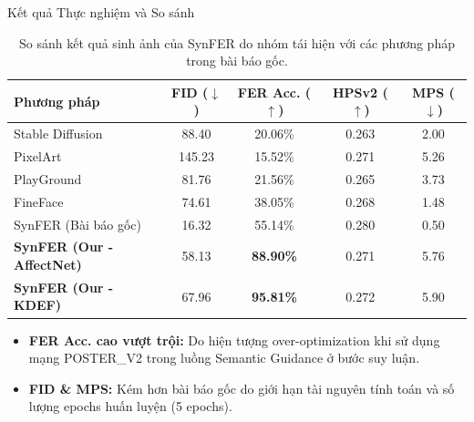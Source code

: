 \begin{frame}{Kết quả Thực nghiệm và So sánh}
    \begin{table}[htbp]
        \caption{So sánh kết quả sinh ảnh của SynFER do nhóm tái hiện với các phương pháp trong bài báo gốc.}
        \label{tab:slide_exp_results}
        \centering
        \small
        \begin{tabular}{lcccc}
            \toprule
            \textbf{Phương pháp}              & \textbf{FID} ($\downarrow$) & \textbf{FER Acc.} ($\uparrow$) & \textbf{HPSv2} ($\uparrow$) & \textbf{MPS} ($\downarrow$) \\
            \midrule
            Stable Diffusion                  & 88.40                       & 20.06\%                        & 0.263                       & 2.00                        \\
            PixelArt                          & 145.23                      & 15.52\%                        & 0.271                       & 5.26                        \\
            PlayGround                        & 81.76                       & 21.56\%                        & 0.265                       & 3.73                        \\
            FineFace                          & 74.61                       & 38.05\%                        & 0.268                       & 1.48                        \\
            SynFER (Bài báo gốc)              & 16.32                       & 55.14\%                        & 0.280                       & 0.50                        \\
            \midrule
            \textbf{SynFER (Our - AffectNet)} & 58.13                       & \textbf{88.90\%}               & 0.271                       & 5.76                        \\
            \textbf{SynFER (Our - KDEF)}      & 67.96                       & \textbf{95.81\%}               & 0.272                       & 5.90                        \\
            \bottomrule
        \end{tabular}
    \end{table}
    \vspace{-0.2cm}
    \begin{itemize}
        \item \textbf{FER Acc. cao vượt trội:} Do hiện tượng over-optimization khi sử dụng mạng POSTER\_V2 trong luồng Semantic Guidance ở bước suy luận.
        \item \textbf{FID \& MPS:} Kém hơn bài báo gốc do giới hạn tài nguyên tính toán và số lượng epochs huấn luyện (5 epochs).
    \end{itemize}
\end{frame}

